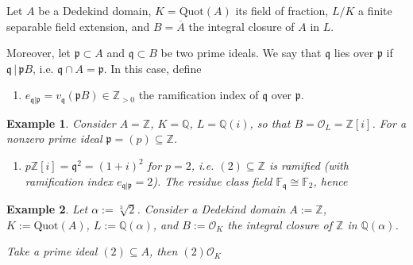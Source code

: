 \documentclass[a4paper]{book}
\theoremstyle{break}
\newtheorem{example}{Example}
\theoremstyle{plain}
\begin{document}
\begin{definition}
    Let \(A\) be a {\color{mathif}Dedekind domain}, \(K = \text{Quot}(A)\) its {\color{mathif}field of fraction}, \(L / K\) a {\color{mathif}finite separable field extension}, and \(B = \overline{A}\) the {\color{mathif}integral closure} of \(A\) in \(L\).
    
    Moreover, let \(\mathfrak{p} \subset A\) and \(\mathfrak{q} \subset B\) be two {\color{mathif}prime ideals}. We say that \(\mathfrak{q}\) {\color{mathrem}lies over} \(\mathfrak{p}\) if \(\mathfrak{q} \, | \, \mathfrak{p}B\), i.e. \(\mathfrak{q} \cap A = \mathfrak{p}\). In this case, define

    \begin{enumerate}
        \item \(e_{\mathfrak{q} | \mathfrak{p}} = v_\mathfrak{q}(\mathfrak{p}B) \in \mathbb{Z}_{>0}\) the {\color{maththen}ramification index} of \(\mathfrak{q}\) over \(\mathfrak{p}\).
    \end{enumerate}
\end{definition}

\begin{example}
    Consider \(A = \mathbb{Z}\), \(K = \mathbb{Q}\), \(L = \mathbb{Q}(i)\), so that \(B = \mathcal{O}_L = \mathbb{Z}[i]\). For a nonzero prime ideal \(\mathfrak{p} = (p) \subseteq \mathbb{Z}\).
    \begin{enumerate}
        \item \(p \mathbb{Z}[i] = \mathfrak{q}^2 = (1 + i)^2\) for \(p = 2\), i.e. \((2) \subseteq \mathbb{Z}\) is ramified (with ramification index \(e_{\mathfrak{q} | \mathfrak{p}} = 2\)). The residue class field \(\mathbb{F}_\mathfrak{q} \cong \mathbb{F}_2\), hence
    \end{enumerate}
\end{example}

\begin{example}
    Let \(\alpha := \sqrt[3]{2}\). Consider a Dedekind domain \(A := \mathbb{Z}\), \(K := \text{Quot}(A)\), \(L := \mathbb{Q}(\alpha)\), and \(B := \mathcal{O}_K\) the integral closure of \(\mathbb{Z}\) in \(\mathbb{Q}(\alpha)\).

    Take a prime ideal \((2) \subseteq A\), then \((2) \mathcal{O}_K\)
\end{example}
\end{document}
